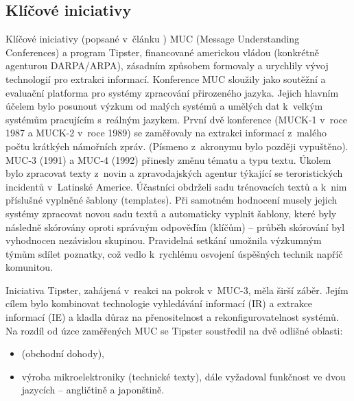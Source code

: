 \documentclass[czech, bc, kiv, he, iso690numb, pdf]{fasthesis}
\begin{document}
\subsection{Klíčové iniciativy}
Klíčové iniciativy (popsané v~článku \cite{information-extraction}) MUC (Message Understanding Conferences)  a program Tipster, financované americkou vládou (konkrétně agenturou DARPA/ARPA), zásadním způsobem formovaly a urychlily vývoj technologií pro extrakci informací. %
Konference MUC sloužily jako soutěžní a evaluační platforma pro systémy zpracování přirozeného jazyka. Jejich hlavním účelem bylo posunout výzkum od malých systémů a umělých dat k~velkým systémům pracujícím s~reálným jazykem. %
První dvě konference (MUCK-1 v~roce 1987 a MUCK-2 v~roce 1989) se zaměřovaly na extrakci informací z~malého počtu krátkých námořních zpráv. (Písmeno  z~akronymu bylo později vypuštěno). MUC-3 (1991) a MUC-4 (1992) přinesly změnu tématu a typu textu. Úkolem bylo zpracovat texty z~novin a zpravodajských agentur týkající se teroristických incidentů v~Latinské Americe. Účastníci obdrželi sadu trénovacích textů a k~nim příslušné vyplněné šablony (templates). Při samotném hodnocení musely jejich systémy zpracovat novou sadu textů a automaticky vyplnit šablony, které byly následně skórovány oproti správným odpověďím (klíčům) -- průběh skórování byl vyhodnocen nezávislou skupinou. Pravidelná setkání umožnila výzkumným týmům sdílet poznatky, což vedlo k~rychlému osvojení úspěšných technik napříč komunitou. %

Iniciativa Tipster, zahájená v~reakci na pokrok v~MUC-3, měla širší záběr. Jejím cílem bylo kombinovat technologie vyhledávání informací (IR) a extrakce informací (IE) a kladla důraz na přenositelnost a rekonfigurovatelnost systémů. Na rozdíl od úzce zaměřených MUC se Tipster soustředil na dvě odlišné oblasti:
\begin{itemize}
    \item {} (obchodní dohody),
    \item výroba mikroelektroniky (technické texty), dále vyžadoval funkčnost ve dvou jazycích -- angličtině a japonštině.
\end{itemize}
\end{document}
